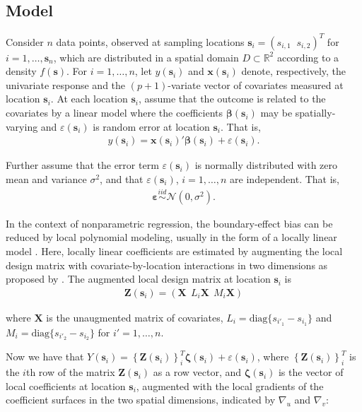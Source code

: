 \documentclass[authoryear, review, 11pt]{elsarticle}
\begin{document}
	\subsection{Model}	
	Consider $n$ data points, observed at sampling locations $\bm{s}_i = (s_{i,1} \;\; s_{i,2})^T$ for $i = 1, \dots, \bm{s}_n$, which are distributed in a spatial domain $D \subset \mathbb{R}^2$ according to a density $f(\bm{s})$. For $i = 1, \dots, n$, let $y(\bm{s}_i)$ and $\bm{x}(\bm{s}_i)$ denote, respectively, the univariate response and the $(p+1)$-variate vector of covariates measured at location $\bm{s}_i$. At each location $\bm{s}_i$, assume that the outcome is related to the covariates by a linear model where the coefficients $\bm{\beta}(\bm{s}_i)$ may be spatially-varying and $\varepsilon(\bm{s}_i)$ is random error at location $\bm{s}_i$. That is,
	\begin{align}\label{eq:lm(s)}
		y(\bm{s}_i) = \bm{x}(\bm{s}_i)' \bm{\beta}(\bm{s}_i) + \varepsilon(\bm{s}_i).
	\end{align}
	
	Further assume that the error term $\varepsilon(\bm{s}_i)$ is normally distributed with zero mean and variance $\sigma^2$, and that $\varepsilon(\bm{s}_i)$, $i=1, \dots, n$ are independent. That is,
	\begin{align} \label{eq:err}
		\bm{\varepsilon} \overset{iid}{\sim} \mathcal{N} \left( 0,\sigma^2 \right).
	\end{align}

    In the context of nonparametric regression, the boundary-effect bias can be reduced by local polynomial modeling, usually in the form of a locally linear model \citep{Fan-1996}. Here, locally linear coefficients are estimated by augmenting the local design matrix with covariate-by-location interactions in two dimensions as proposed by \cite{Wang:2008b}. The augmented local design matrix at location $\bm{s}_i$ is
    \begin{align}
		\bm{Z}(\bm{s}_i) = \left( \bm{X}  \:\: L_i \bm{X} \:\: M_i \bm{X} \right)
	\end{align} 
  
	where $\bm{X}$ is the unaugmented matrix of covariates, $L_i = \text{diag}\{s_{i'_1} - s_{i_1}\}$ and $M_i = \text{diag}\{s_{i'_2} - s_{i_2}\}$ for $i' = 1, \dots, n$.

    Now we have that $Y(\bm{s}_i) = \left\{ \bm{Z}(\bm{s}_i) \right\}^T_i \bm{\zeta}(\bm{s}_i) + \varepsilon(\bm{s}_i)$, where $\left\{ \bm{Z}(\bm{s}_i) \right\}^T_i$ is the $i$th row of the matrix $\bm{Z}(\bm{s}_i)$ as a row vector, and $\bm{\zeta}(\bm{s}_i)$ is the vector of local coefficients at location $\bm{s}_i$, augmented with the local gradients of the coefficient surfaces in the two spatial dimensions, indicated by $\nabla_u$ and $\nabla_v$:
\end{document}

